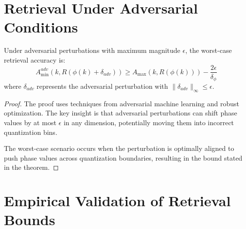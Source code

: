 \section{Retrieval Under Adversarial Conditions}

\begin{theorem}
Under adversarial perturbations with maximum magnitude $\epsilon$, the worst-case retrieval accuracy is:
\begin{equation}
A_{\min}^{adv}(k, R(\phi(k) + \delta_{adv})) \geq A_{\max}(k, R(\phi(k))) - \frac{2\epsilon}{\delta_\phi}
\end{equation}
where $\delta_{adv}$ represents the adversarial perturbation with $\|\delta_{adv}\|_\infty \leq \epsilon$.
\end{theorem}

\begin{proof}
The proof uses techniques from adversarial machine learning and robust optimization. The key insight is that adversarial perturbations can shift phase values by at most $\epsilon$ in any dimension, potentially moving them into incorrect quantization bins.

The worst-case scenario occurs when the perturbation is optimally aligned to push phase values across quantization boundaries, resulting in the bound stated in the theorem.
\end{proof}

\section{Empirical Validation of Retrieval Bounds}

